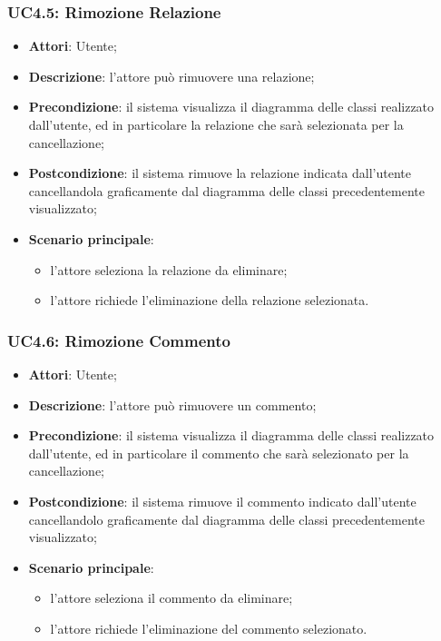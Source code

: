\subsubsection{UC4.5: Rimozione Relazione}
\label{UC4.5}
\begin{itemize}
\item \textbf{Attori}: Utente;
\item \textbf{Descrizione}: l'attore può rimuovere una relazione;	
\item \textbf{Precondizione}: il sistema visualizza il diagramma delle classi realizzato dall'utente, ed in particolare la relazione che sarà selezionata per la cancellazione;
\item \textbf{Postcondizione}: il sistema rimuove la relazione indicata dall'utente cancellandola graficamente dal diagramma delle classi precedentemente visualizzato;
\item \textbf{Scenario principale}:
\begin{itemize}
	\item l'attore seleziona la relazione da eliminare;
	\item l'attore richiede l'eliminazione della relazione selezionata.
\end{itemize}	
\end{itemize}

\subsubsection{UC4.6: Rimozione Commento	}
\label{UC4.6}
\begin{itemize}
\item \textbf{Attori}: Utente;
\item \textbf{Descrizione}: l'attore può rimuovere un commento;
\item \textbf{Precondizione}: il sistema visualizza il diagramma delle classi realizzato dall'utente, ed in particolare il commento che sarà selezionato per la cancellazione;
\item \textbf{Postcondizione}: il sistema rimuove il commento indicato dall'utente cancellandolo graficamente dal diagramma delle classi precedentemente visualizzato;
\item \textbf{Scenario principale}:
\begin{itemize}
	\item l'attore seleziona il commento da eliminare;
	\item l'attore richiede l'eliminazione del commento selezionato.
\end{itemize}		
\end{itemize}

